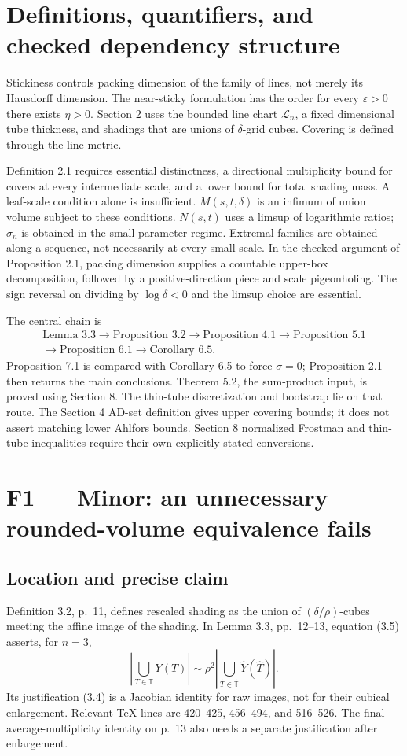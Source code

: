 \documentclass[10pt]{article}
\begin{document}
\section*{Definitions, quantifiers, and checked dependency structure}
Stickiness controls packing dimension of the family of lines, not merely its Hausdorff dimension. The near-sticky formulation has the order for every \(\varepsilon>0\) there exists \(\eta>0\). Section 2 uses the bounded line chart \(\mathcal L_n\), a fixed dimensional tube thickness, and shadings that are unions of \(\delta\)-grid cubes. Covering is defined through the line metric.\par
Definition 2.1 requires essential distinctness, a directional multiplicity bound for covers at every intermediate scale, and a lower bound for total shading mass. A leaf-scale condition alone is insufficient. \(M(s,t,\delta)\) is an infimum of union volume subject to these conditions. \(N(s,t)\) uses a limsup of logarithmic ratios; \(\sigma_n\) is obtained in the small-parameter regime. Extremal families are obtained along a sequence, not necessarily at every small scale. In the checked argument of Proposition 2.1, packing dimension supplies a countable upper-box decomposition, followed by a positive-direction piece and scale pigeonholing. The sign reversal on dividing by \(\log\delta<0\) and the limsup choice are essential.\par
The central chain is \[\begin{gathered}
\text{Lemma 3.3}\to\text{Proposition 3.2}\to\text{Proposition 4.1}
\to\text{Proposition 5.1}\\
\to\text{Proposition 6.1}\to\text{Corollary 6.5}.
\end{gathered}\] Proposition 7.1 is compared with Corollary 6.5 to force \(\sigma=0\); Proposition 2.1 then returns the main conclusions. Theorem 5.2, the sum-product input, is proved using Section 8. The thin-tube discretization and bootstrap lie on that route. The Section 4 AD-set definition gives upper covering bounds; it does not assert matching lower Ahlfors bounds. Section 8 normalized Frostman and thin-tube inequalities require their own explicitly stated conversions.\par
\section*{F1 — Minor: an unnecessary rounded-volume equivalence fails}
\subsection*{Location and precise claim}
Definition 3.2, p. 11, defines rescaled shading as the union of \((\delta/\rho)\)-cubes meeting the affine image of the shading. In Lemma 3.3, pp. 12–13, equation (3.5) asserts, for \(n=3\), \[\left|\bigcup_{T\in\mathbb T}Y(T)\right|
 \sim \rho^2
 \left|\bigcup_{\widehat T\in\widehat{\mathbb T}}
              \widehat Y(\widehat T)\right|.
 \tag{F1.1}\] Its justification (3.4) is a Jacobian identity for raw images, not for their cubical enlargement. Relevant TeX lines are 420–425, 456–494, and 516–526. The final average-multiplicity identity on p. 13 also needs a separate justification after enlargement.\par
\end{document}
